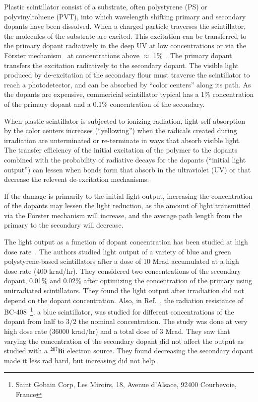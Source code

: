 \documentclass[review]{elsarticle}
\begin{document}
Plastic scintillator consist of a substrate, 
often polystyrene (PS) or polyvinyltoluene (PVT),
into which wavelength 
shifting primary and secondary dopants have been dissolved.
When a charged particle traverses the scintillator, the molecules of the substrate are excited.  
This excitation can be transferred to the primary dopant radiatively 
in the deep UV at low concentrations or 
via the F{\"o}rster mechanism~\cite{forster} at concentrations above $\approx$ 1\%~\cite{birks}.  
The primary dopant transfers the excitation radiatively to the secondary dopant.  
The visible light produced by de-excitation of the secondary flour
must traverse the scintillator to reach a photodetector, 
and can be absorbed by ``color centers'' along its path.
As the dopants are expensive, commericial scintillator typical has a 1\% concentration of the
primary dopant and a 0.1\% concentration of the secondary.

When plastic scintillator is subjected to ionizing radiation,
light self-absorption by the color centers  increases (``yellowing'') when the 
radicals created during irradiation are unterminated or 
re-terminate in ways that absorb visible light.
The transfer efficiency of the initial excitation of the polymer to the
dopants combined with the probability of 
radiative decays for the dopants (``initial light output'') can lessen
when bonds form that absorb in the ultraviolet (UV) or 
that decrease the relevent de-excitation mechanisms.

If the damage is primarily to the initial light output, increasing the concentration 
of the dopants may lessen the light reduction, as the amount of light transmitted
via the F{\"o}rster mechanism will increase, and the average path length from the primary to the
secondary will decrease.

The light output as a function of dopant concentration has been studied
at high dose rate~\cite{Bross199135}.  The authors studied light output
of a variety of blue and  green polystyrene-based scintillators
after a dose of 10 Mrad accumulated at a high dose rate (400 krad/hr).
They considered two concentrations of the secondary dopant,
0.01\% and 0.02\% after optimizing the
concentration of the primary using unirradiated scintillators.  They found
the light output after irradiation did not depend on the dopant concentration.
Also, in Ref.~\cite{Majewski1989500}, the radiation resistance of 
BC-408~\footnote{Saint Gobain Corp, Les Miroirs, 18, Avenue d'Alsace, 92400 Courbevoie, France},
a blue scintillator,
was studied for different concentrations of the dopant from half to $3/2$ 
the nominal concentration.  The study was done at very high dose rate 
(36000 krad/hr) and a total dose of 3 Mrad.  
They saw that varying the concentration of the secondary dopant 
did not affect the output as studied with a $\rm{^{207}Bi}$ electron source.  
They found decreasing the secondary dopant made it less rad hard, but increasing did not help.  
\end{document}
